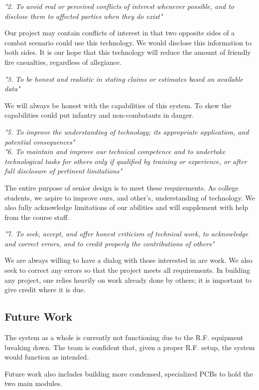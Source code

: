 \documentclass[letterpaper,10pt]{article}
\begin{document}
\begin{spacing}{1.15}
\textit{"2. To avoid real or perceived conflicts of interest whenever possible, and to disclose them to affected parties when they do exist"}

Our project may contain conflicts of interest in that two opposite sides of a combat scenario could use this technology. We would disclose this information to both sides. It is our hope that this technology will reduce the amount of friendly fire casualties, regardless of allegiance. 

\textit{"3. To be honest and realistic in stating claims or estimates based on available data"}

We will always be honest with the capabilities of this system. To skew the capabilities could put infantry and non-combatants in danger. 

\textit{"5. To improve the understanding of technology; its appropriate application, and potential consequences"}\\
\textit{"6. To maintain and improve our technical competence and to undertake technological tasks for others only if qualified by training or experience, or after full disclosure of pertinent limitations"}

The entire purpose of senior design is to meet these requirements. As college students, we aspire to improve ours, and other's, understanding of technology. We also fully acknowledge limitations of our abilities and will supplement with help from the course staff. 

\textit{"7. To seek, accept, and offer honest criticism of technical work, to acknowledge and correct errors, and to credit properly the contributions of others"}

We are always willing to have a dialog with those interested in are work. We also seek to correct any errors so that the project meets all requirements. In building any project, one relies heavily on work already done by others; it is important to give credit where it is due. 


\subsection{Future Work}

The system as a whole is currently not functioning due to the R.F. equipment breaking down. The team is confident that, given a proper R.F. setup, the system would function as intended. 

Future work also includes building more condensed, specialized PCBs to hold the two main modules. 


\end{spacing}
\end{document}
